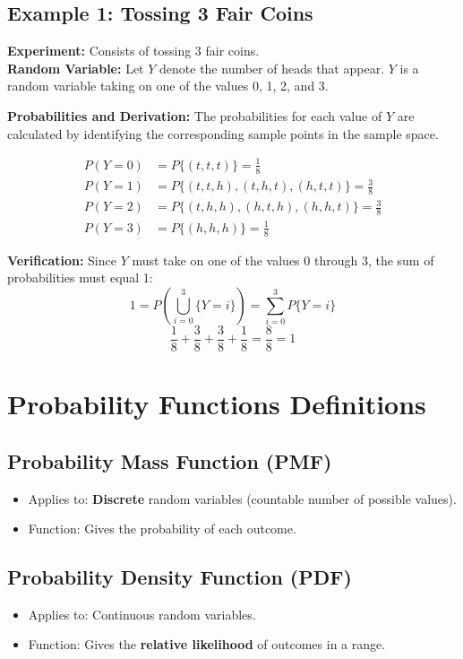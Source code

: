 \documentclass[11pt, a4paper]{article}
\begin{document}
\subsection{Example 1: Tossing 3 Fair Coins}
\textbf{Experiment:} Consists of tossing 3 fair coins. \\
\textbf{Random Variable:} Let $Y$ denote the number of heads that appear. $Y$ is a random variable taking on one of the values 0, 1, 2, and 3.

\textbf{Probabilities and Derivation:}
The probabilities for each value of $Y$ are calculated by identifying the corresponding sample points in the sample space.

\begin{align*}
    P(Y=0) &= P\{(t,t,t)\} = \frac{1}{8} \\
    P(Y=1) &= P\{(t,t,h), (t,h,t), (h,t,t)\} = \frac{3}{8} \\
    P(Y=2) &= P\{(t,h,h), (h,t,h), (h,h,t)\} = \frac{3}{8} \\
    P(Y=3) &= P\{(h,h,h)\} = \frac{1}{8}
\end{align*}

\textbf{Verification:}
Since $Y$ must take on one of the values 0 through 3, the sum of probabilities must equal 1:
\[
1 = P\left(\bigcup_{i=0}^{3} \{Y=i\}\right) = \sum_{i=0}^{3} P\{Y=i\}
\]
\[
\frac{1}{8} + \frac{3}{8} + \frac{3}{8} + \frac{1}{8} = \frac{8}{8} = 1
\]

\section{Probability Functions Definitions}

\subsection{Probability Mass Function (PMF)}
\begin{itemize}
    \item Applies to: \textbf{Discrete} random variables (countable number of possible values).
    \item Function: Gives the probability of each outcome.
\end{itemize}

\subsection{Probability Density Function (PDF)}
\begin{itemize}
    \item Applies to: Continuous random variables.
    \item Function: Gives the \textbf{relative likelihood} of outcomes in a range.
\end{itemize}
\end{document}
